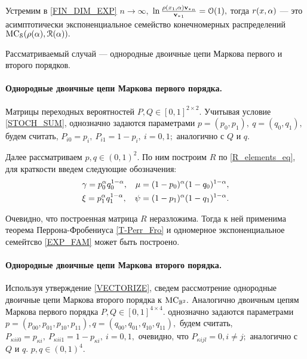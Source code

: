 Устремим в \eqref{FIN_DIM_EXP} $n \rightarrow \infty,$ $\ln \frac{\rho(x_1, \alpha){{\mathbf{v}_\ast}}_n}{{{\mathbf{v}_\ast}}_1} = \mathcal{O}(1),$ тогда $r(x, \alpha)$ --- это асимптотически экспоненциальное семейство конечномерных распределений $\mathrm{MC}_{\mathcal{S}}(\rho(\alpha), \mathcal{R}(\alpha)).$ 


Рассматриваемый случай --- однородные двоичные цепи Маркова первого и второго порядков. 

\paragraph{Однородные двоичные цепи Маркова первого порядка.}

Матрицы переходных вероятностей $P, Q \in [0, 1]^{2 \times 2}.$ Учитывая условие \eqref{STOCH_SUM}, однозначно задаются параметрами $p = (p_0, p_1),\  q = (q_0, q_1),$ будем считать, $P_{i0} = p_i, \ P_{i1} = 1 - p_i, \ i = 0, 1;$ аналогично с $Q$ и $q.$

Далее рассматриваем $p, q \in (0, 1)^{2}.$ По ним построим $R$ по \eqref{R_elements_eq}, для краткости введем следующие обозначения:
\begin{align}
\label{R_1}
& \gamma = p_0^\alpha q_0^{1 - \alpha}, & \mu = (1 - p_0)^\alpha (1 - q_0)^{1 - \alpha}, \nonumber \\
& \xi = p_1^\alpha q_1^{1 - \alpha}, & \psi = (1 - p_1)^\alpha (1 - q_1)^{1 - \alpha}. 
\end{align}

Очевидно, что построенная матрица $R$ неразложима. Тогда к ней применима теорема Перрона-Фробениуса \ref{T-Perr_Fro} и одномерное экспоненциальное семейтсво \eqref{EXP_FAM} может быть построено.

\paragraph{Однородные двоичные цепи Маркова второго порядка.} 

Используя утверждение \ref{VECTORIZE}, сведем рассмотрение однородные двоичные цепи Маркова второго порядка к $\mathrm{MC}_{\mathbb{B}^2}.$ Аналогично двоичным цепям Маркова первого порядка $P, Q \in [0, 1]^{4 \times 4}.$ однозначно задаются параметрами $p = (p_{00}, p_{01}, p_{10}, p_{11}), q = (q_{00}, q_{01}, q_{10}, q_{11}),$ будем считать, $P_{{\kappa}i i0} = p_{{\kappa}i}, \ P_{{\kappa}i i1} = 1 - p_{{\kappa}i}, \ i = 0, 1,$ очевидно, что $P_{{\kappa}i jl} = 0, i \neq j;$ аналогично с $Q$ и $q.$ $p, q \in (0, 1)^{4}.$

